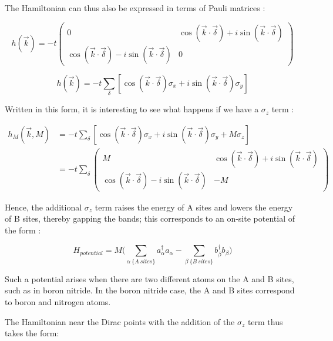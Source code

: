 \documentclass[]{article}
\begin{document}
The Hamiltonian can thus also be expressed in terms of Pauli matrices \cite{graphene_tight_bonding}:

\begin{equation}
	h(\vec{k}) = -t \begin{pmatrix}
		0 & \cos(\vec{k}\cdot \vec{\delta}) + i\sin(\vec{k}\cdot \vec{\delta}) \\
		\cos(\vec{k}\cdot \vec{\delta}) - i\sin(\vec{k}\cdot \vec{\delta}) & 0
				\end{pmatrix} 
\end{equation}

\begin{equation}
	h(\vec{k}) = -t \sum_{\delta}[\cos(\vec{k}\cdot \vec{\delta})\sigma_x + i\sin(\vec{k}\cdot \vec{\delta})\sigma_y]
\end{equation}

Written in this form, it is interesting to see what happens if we have a $\sigma_z$ term \cite{graphene_tight_bonding}:

\begin{align}
	h_M (\vec{k}, M) &= -t\sum_{\delta} [\cos(\vec{k}\cdot \vec{\delta})\sigma_x + i\sin(\vec{k}\cdot \vec{\delta})\sigma_y + M\sigma_z]\\
	&= -t \sum_{\delta} \begin{pmatrix}
		M & \cos(\vec{k}\cdot \vec{\delta}) + i\sin(\vec{k}\cdot \vec{\delta}) \\
		\cos(\vec{k}\cdot \vec{\delta}) - i\sin(\vec{k}\cdot \vec{\delta}) & -M
	\end{pmatrix} 
\end{align}

Hence, the additional $\sigma_z$ term raises the energy of A sites and lowers the energy of B sites, thereby gapping the bands; this corresponds to an on-site potential of the form \cite{graphene_tight_bonding}:

\begin{equation}
	H_{potential} = M \bigg( \sum_{\alpha \ \{A \ sites\}} a_{\alpha}^{\dagger}a_{\alpha} - \sum_{\beta \ \{B \ sites\}} b_{\beta}^{\dagger}b_{\beta} \bigg )
\end{equation}

Such a potential arises when there are two different atoms on the A and B sites, such as in boron nitride. In the boron nitride case, the A and B sites correspond to boron and nitrogen atoms.
\newline

The Hamiltonian near the Dirac points with the addition of the $\sigma_z$ term thus takes the form:
\end{document}
